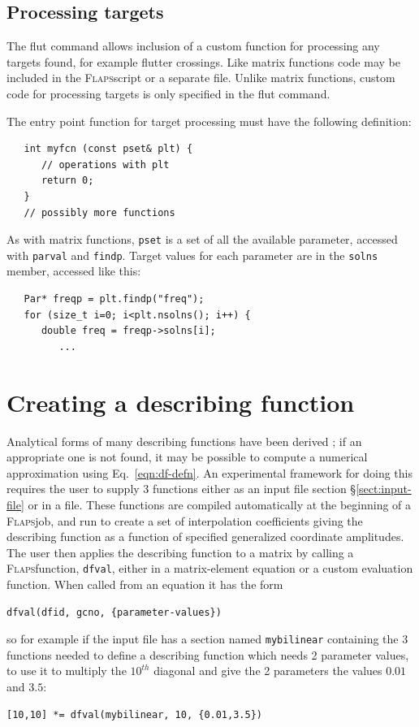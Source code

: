 \documentclass[11pt,openany,twoside]{book}
\numberwithin{equation}{section}		%
\newcommand{\Cmd}[1]{{\sf #1}}
\newcommand{\Code}[1]{{\small\tt #1}}
\newcommand{\Flaps}{\textsc{Flaps\:}}
\newcommand{\Sectref}[1]{\S\ref{#1}}
\newcommand{\Eqn}[1]{Eq.\ \ref{#1}}  %
\begin{document}
\subsection{Processing targets}\label{sect:target-proc}
The \Cmd{flut} command allows inclusion of a custom function for processing
any targets found, for example flutter crossings. Like matrix functions code
may be included in the \Flaps script or a separate file. Unlike matrix
functions, custom code for processing targets is only specified in the
\Cmd{flut} command.

The entry point function for target processing must have the following
definition:
\begin{lstlisting}
   int myfcn (const pset& plt) {
      // operations with plt
      return 0;
   }
   // possibly more functions
\end{lstlisting}
As with matrix functions, \Code{pset} is a set of all the available
parameter, accessed with \Code{parval} and \Code{findp}.
Target values for each parameter are in the \Code{solns} member,
accessed like this:
\begin{lstlisting}
   Par* freqp = plt.findp("freq");
   for (size_t i=0; i<plt.nsolns(); i++) {
      double freq = freqp->solns[i];
         ...
\end{lstlisting}


\section{Creating a describing function}\label{sect:df-approx}
Analytical forms of many describing functions have been 
derived \cite{gelb1968multiple}; if an appropriate one is not
found, it may be possible to compute a numerical approximation
using \Eqn{eqn:df-defn}.
An experimental framework for doing this requires the user to supply
3 functions either as an input file section \Sectref{sect:input-file} or
in a file. These functions are compiled automatically at the beginning
of a \Flaps job, and run to create a set of interpolation coefficients
giving the describing function as a function of specified generalized
coordinate amplitudes. The user then applies the describing function
to a matrix by calling a \Flaps function, \Code{dfval}, either in
a matrix-element equation or a custom evaluation function. When called
from an equation it has the form
\begin{lstlisting}
dfval(dfid, gcno, {parameter-values})
\end{lstlisting}
so for example if the input file has a section named \Code{mybilinear}
containing the 3 functions needed to define a describing function which
needs 2 parameter values, to use it to multiply the $10^{th}$ diagonal
and give the 2 parameters the values $0.01$ and $3.5$:
\begin{lstlisting}
[10,10] *= dfval(mybilinear, 10, {0.01,3.5})
\end{lstlisting}
\end{document}
